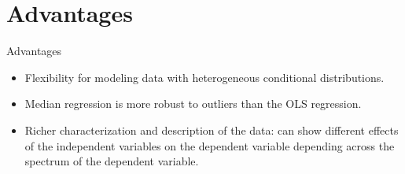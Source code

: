 \documentclass[unknownkeysallowed]{beamer}
\begin{document}
\section{Advantages}
\label{sec:Advantages}
\begin{frame}{Advantages}

\begin{itemize}
    \item Flexibility for modeling data with heterogeneous conditional distributions.
    \item Median regression is more robust to outliers than the OLS regression.
    \item Richer characterization and description of the data: can show different effects of the independent variables on the dependent variable depending across the spectrum of the dependent variable.
\end{itemize}   

\end{frame}
\end{document}
